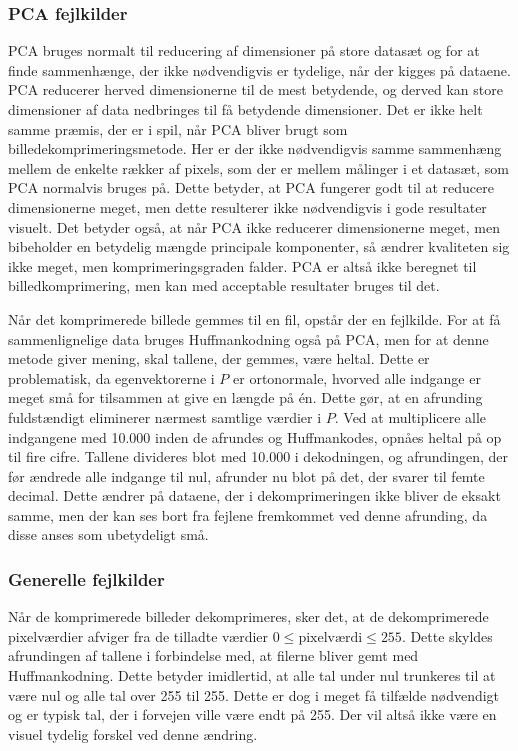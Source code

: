 \subsubsection{PCA fejlkilder}
PCA bruges normalt til reducering af dimensioner på store datasæt og for at finde sammenhænge, der ikke nødvendigvis er tydelige, når der kigges på dataene. PCA reducerer herved dimensionerne til de mest betydende, og derved kan store dimensioner af data nedbringes til få betydende dimensioner. Det er ikke helt samme præmis, der er i spil, når PCA bliver brugt som billedekomprimeringsmetode. Her er der ikke nødvendigvis samme sammenhæng mellem de enkelte rækker af pixels, som der er mellem målinger i et datasæt, som PCA normalvis bruges på. Dette betyder, at PCA fungerer godt til at reducere dimensionerne meget, men dette resulterer ikke nødvendigvis i gode resultater visuelt. Det betyder også, at når PCA ikke reducerer dimensionerne meget, men bibeholder en betydelig mængde principale komponenter, så ændrer kvaliteten sig ikke meget, men komprimeringsgraden falder. PCA er altså ikke beregnet til billedkomprimering, men kan med acceptable resultater bruges til det.

Når det komprimerede billede gemmes til en fil, opstår der en fejlkilde. For at få sammenlignelige data bruges Huffmankodning også på PCA, men for at denne metode giver mening, skal tallene, der gemmes, være heltal. Dette er problematisk, da egenvektorerne i $P$ er ortonormale, hvorved alle indgange er meget små for tilsammen at give en længde på én. Dette gør, at en afrunding fuldstændigt eliminerer nærmest samtlige værdier i $P$. Ved at multiplicere alle indgangene med 10.000 inden de afrundes og Huffmankodes, opnåes heltal på op til fire cifre. Tallene divideres blot med 10.000 i dekodningen, og afrundingen, der før ændrede alle indgange til nul, afrunder nu blot på det, der svarer til femte decimal. Dette ændrer på dataene, der i dekomprimeringen ikke bliver de eksakt samme, men der kan ses bort fra fejlene fremkommet ved denne afrunding, da disse anses som ubetydeligt små.

\subsubsection{Generelle fejlkilder}
Når de komprimerede billeder dekomprimeres, sker det, at de dekomprimerede pixelværdier afviger fra de tilladte værdier $0 \leq \text{pixelværdi} \leq 255$. Dette skyldes afrundingen af tallene i forbindelse med, at filerne bliver gemt med Huffmankodning. Dette betyder imidlertid, at alle tal under nul trunkeres til at være nul og alle tal over 255 til 255. Dette er dog i meget få tilfælde nødvendigt og er typisk tal, der i forvejen ville være endt på 255. Der vil altså ikke være en visuel tydelig forskel ved denne ændring.

